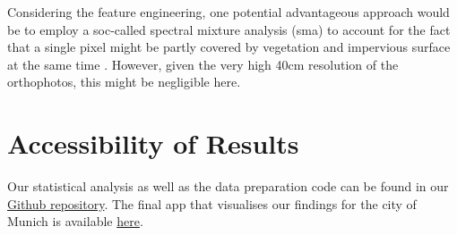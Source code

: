 \documentclass[12pt]{article}
\begin{document}
Considering the feature engineering, one potential advantageous approach would be to employ a soc-called spectral mixture analysis (\acrshort{sma}) to account for the fact that a single pixel might be partly covered by vegetation and impervious surface at the same time \citep{ridd1995}. However, given the very high 40cm resolution of the orthophotos, this might be negligible here.

\section{Accessibility of Results}

Our statistical analysis as well as the data preparation code can be found in our \href{https://github.com/MGenschow/DS_Project}{Github repository}. The final app that visualises our findings for the city of Munich is available \href{http://193.196.54.113:8050/}{here}.


\newpage
\printglossary[type=\acronymtype, nonumberlist, title={Abbreviations}]

\newpage
{}

\end{document}
